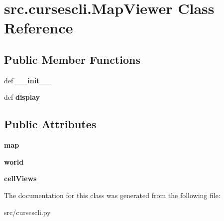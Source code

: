 \hypertarget{classsrc_1_1cursescli_1_1_map_viewer}{\section{src.\-cursescli.\-Map\-Viewer \-Class \-Reference}
\label{classsrc_1_1cursescli_1_1_map_viewer}
}
\subsection*{\-Public \-Member \-Functions}
\begin{DoxyCompactItemize}
\item 
\hypertarget{classsrc_1_1cursescli_1_1_map_viewer_adb6b4b3785a77d27d5572ad0dce523cd}{def {\bfseries \-\_\-\-\_\-init\-\_\-\-\_\-}}\label{classsrc_1_1cursescli_1_1_map_viewer_adb6b4b3785a77d27d5572ad0dce523cd}

\item 
\hypertarget{classsrc_1_1cursescli_1_1_map_viewer_a718d614417fb7004b3ffde1ca750ac8c}{def {\bfseries display}}\label{classsrc_1_1cursescli_1_1_map_viewer_a718d614417fb7004b3ffde1ca750ac8c}

\end{DoxyCompactItemize}
\subsection*{\-Public \-Attributes}
\begin{DoxyCompactItemize}
\item 
\hypertarget{classsrc_1_1cursescli_1_1_map_viewer_ac3f7f8b0aa940244e7a7b13b40c8b410}{{\bfseries map}}\label{classsrc_1_1cursescli_1_1_map_viewer_ac3f7f8b0aa940244e7a7b13b40c8b410}

\item 
\hypertarget{classsrc_1_1cursescli_1_1_map_viewer_a866adc09259481040308ff887910987c}{{\bfseries world}}\label{classsrc_1_1cursescli_1_1_map_viewer_a866adc09259481040308ff887910987c}

\item 
\hypertarget{classsrc_1_1cursescli_1_1_map_viewer_a7beea5f1784ce6cbc23533294afd1e58}{{\bfseries cell\-Views}}\label{classsrc_1_1cursescli_1_1_map_viewer_a7beea5f1784ce6cbc23533294afd1e58}

\end{DoxyCompactItemize}


\-The documentation for this class was generated from the following file\-:\begin{DoxyCompactItemize}
\item 
src/cursescli.\-py\end{DoxyCompactItemize}
